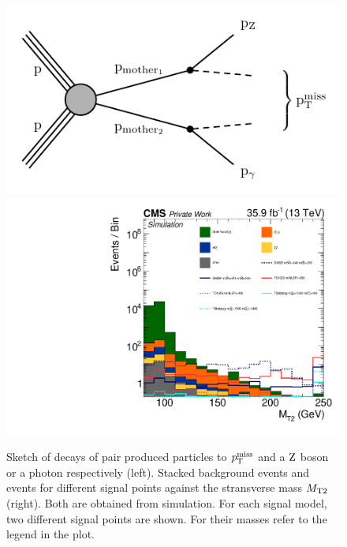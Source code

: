 \begin{figure}
 \centering
 \includegraphics[width=\pairwidth]{figures/mt2/graph}
 \includegraphics[width=\pairwidth]{figures/plots/onZ_LL_mt2_log}
 \caption{Sketch of decays of pair produced particles to $p_{\mathrm{T}}^\text{miss}$ and a $\mathrm{Z}$ boson or a photon respectively (left). Stacked background events and events for different signal points against the stransverse mass $M_{\mathrm{T2}}$ (right). Both are obtained from simulation. For each signal model, two different signal points are shown. For their masses refer to the legend in the plot.}
 \label{fig:mt2}
\end{figure}


